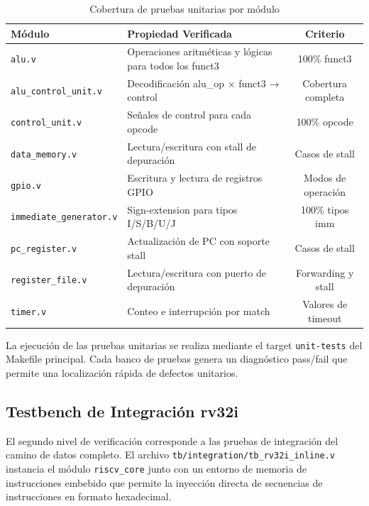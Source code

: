 \begin{table}[H]
\centering
\begin{tabular}{|l|p{6cm}|c|}
\hline
\textbf{Módulo} & \textbf{Propiedad Verificada} & \textbf{Criterio} \\
\hline
\texttt{alu.v} & Operaciones aritméticas y lógicas para todos los funct3 & 100\% funct3 \\
\hline
\texttt{alu\_control\_unit.v} & Decodificación alu\_op × funct3 → control & Cobertura completa \\
\hline
\texttt{control\_unit.v} & Señales de control para cada opcode & 100\% opcode \\
\hline
\texttt{data\_memory.v} & Lectura/escritura con stall de depuración & Casos de stall \\
\hline
\texttt{gpio.v} & Escritura y lectura de registros GPIO & Modos de operación \\
\hline
\texttt{immediate\_generator.v} & Sign-extension para tipos I/S/B/U/J & 100\% tipos imm \\
\hline
\texttt{pc\_register.v} & Actualización de PC con soporte stall & Casos de stall \\
\hline
\texttt{register\_file.v} & Lectura/escritura con puerto de depuración & Forwarding y stall \\
\hline
\texttt{timer.v} & Conteo e interrupción por match & Valores de timeout \\
\hline
\end{tabular}
\caption{Cobertura de pruebas unitarias por módulo}
\label{tab:UnitCoverage}
\end{table}

La ejecución de las pruebas unitarias se realiza mediante el target \texttt{unit-tests} del Makefile principal. Cada banco de pruebas genera un diagnóstico pass/fail que permite una localización rápida de defectos unitarios.

\subsection{Testbench de Integración rv32i}
\label{sec:IntegrationTB}

El segundo nivel de verificación corresponde a las pruebas de integración del camino de datos completo. El archivo \texttt{tb/integration/tb\_rv32i\_inline.v} instancia el módulo \texttt{riscv\_core} junto con un entorno de memoria de instrucciones embebido que permite la inyección directa de secuencias de instrucciones en formato hexadecimal.

